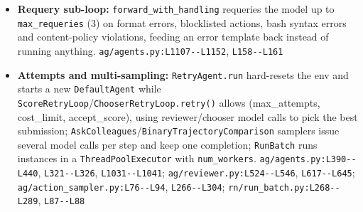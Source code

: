 \begin{itemize}
\item \textbf{Requery sub-loop:} \texttt{forward\_\allowbreak{}with\_\allowbreak{}handling} requeries the model up to \texttt{max\_\allowbreak{}requeries} (3) on format errors, blocklisted actions, bash syntax errors and content-policy violations, feeding an error template back instead of running anything. \texttt{ag/\allowbreak{}agents.\allowbreak{}py:\allowbreak{}L1107-\allowbreak{}-\allowbreak{}L1152}, \texttt{L158-\allowbreak{}-\allowbreak{}L161}
\item \textbf{Attempts and multi-sampling:} \texttt{RetryAgent.\allowbreak{}run} hard-resets the env and starts a new \texttt{DefaultAgent} while \texttt{ScoreRetryLoop}/\texttt{ChooserRetryLoop.\allowbreak{}retry(\allowbreak{})} allows (max\_attempts, cost\_limit, accept\_score), using reviewer/chooser model calls to pick the best submission; \texttt{AskColleagues}/\texttt{BinaryTrajectoryComparison} samplers issue several model calls per step and keep one completion; \texttt{RunBatch} runs instances in a \texttt{ThreadPoolExecutor} with \texttt{num\_\allowbreak{}workers}. \texttt{ag/\allowbreak{}agents.\allowbreak{}py:\allowbreak{}L390-\allowbreak{}-\allowbreak{}L440}, \texttt{L321-\allowbreak{}-\allowbreak{}L326}, \texttt{L1031-\allowbreak{}-\allowbreak{}L1041}; \texttt{ag/\allowbreak{}reviewer.\allowbreak{}py:\allowbreak{}L524-\allowbreak{}-\allowbreak{}L546}, \texttt{L617-\allowbreak{}-\allowbreak{}L645}; \texttt{ag/\allowbreak{}action\_\allowbreak{}sampler.\allowbreak{}py:\allowbreak{}L76-\allowbreak{}-\allowbreak{}L94}, \texttt{L266-\allowbreak{}-\allowbreak{}L304}; \texttt{rn/\allowbreak{}run\_\allowbreak{}batch.\allowbreak{}py:\allowbreak{}L268-\allowbreak{}-\allowbreak{}L289}, \texttt{L87-\allowbreak{}-\allowbreak{}L88}
\end{itemize}

